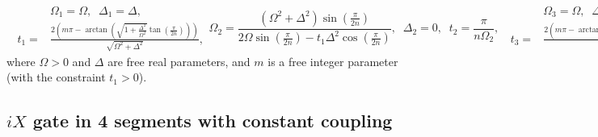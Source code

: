 \documentclass[floatfix,reprint, amsmath,amssymb,aps,superscriptaddress,nofootinbib]{revtex4-2}
\begin{document}
\begin{enumerate}
\begin{subequations}
\begin{equation}
\begin{split}
    & \Omega_1=\Omega  , \;\; \Delta_1=\Delta  , \\ \;\; t_1=&\frac{2\left(m\pi-\arctan{\left( \sqrt{1+\frac{\Delta^2}{\Omega^2}} \tan{\left( \frac{\pi}{2n} \right)} \right)}\right)}{\sqrt{\Omega^2+\Delta^2}}  , 
\end{split}
\end{equation}

\begin{equation}
    \Omega_2= \frac{ \left(\Omega^2+\Delta^2\right) \sin{\left( \frac{\pi}{2n} \right)}}{2\Omega \sin{\left( \frac{\pi}{2n} \right)} -t_1 \Delta^2 \cos{\left( \frac{\pi}{2n} \right)}}  , \;\; \Delta_2=0  , \;\; t_2=\frac{\pi}{n \Omega_2}  , 
\end{equation}

\begin{equation}
\begin{split}
    & \Omega_3=\Omega  , \;\; \Delta_3=-\Delta  , \\ \;\; t_3=&\frac{2\left(m\pi-\arctan{\left( \sqrt{1+\frac{\Delta^2}{\Omega^2}} \tan{\left( \frac{\pi}{2n} \right)} \right)}\right)}{\sqrt{\Omega^2+\Delta^2}}  , 
\end{split}
\end{equation}
\label{eq: (iX)^1/n gate in 3 segments D}
\end{subequations}
where $\Omega>0$ and $\Delta$ are free real parameters, and $m$ is a free integer parameter (with the constraint $t_1>0$).

\end{enumerate}


\subsection{\texorpdfstring{$iX$}{Lg} gate in 4 segments with constant coupling}
\end{document}
